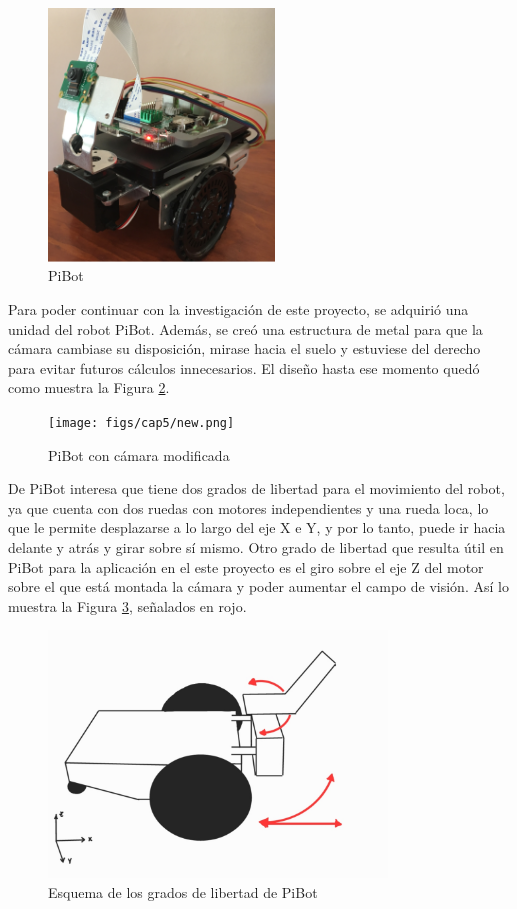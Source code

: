\begin{figure} [h!]
	\begin{center}
		\includegraphics[width=6cm]{figs/cap5/Original.png}
	\end{center}
	\caption{PiBot} 
	\label{fig:pibot}
\end{figure}

Para poder continuar con la investigación de este proyecto, se adquirió una unidad del robot PiBot. Además, se creó una estructura de metal para que la cámara cambiase su disposición, mirase hacia el suelo y estuviese del derecho para evitar futuros cálculos innecesarios. El diseño hasta ese momento quedó como muestra la Figura \ref{fig:pibotmetal}.


\begin{figure} [h!]
	\begin{center}
		\texttt{[image: figs/cap5/new.png]}
	\end{center}
	\caption{PiBot con cámara modificada} 
	\label{fig:pibotmetal}
\end{figure}


De PiBot interesa que tiene dos grados de libertad para el movimiento del robot, ya que cuenta con dos ruedas con motores independientes y una rueda loca, lo que le permite desplazarse a lo largo del eje X e Y, y por lo tanto, puede ir hacia delante y atrás y girar sobre sí mismo. Otro grado de libertad que resulta útil en PiBot para la aplicación en el este proyecto es el giro sobre el eje Z del motor sobre el que está montada la cámara y poder aumentar el campo de visión. Así lo muestra la Figura \ref{fig:esquemaDOF}, señalados en rojo.


\begin{figure} [h!]
	\begin{center}
		\includegraphics[width=9cm]{figs/cap5/dof.jpg}
	\end{center}
	\caption{Esquema de los grados de libertad de PiBot} 
	\label{fig:esquemaDOF}
\end{figure}



